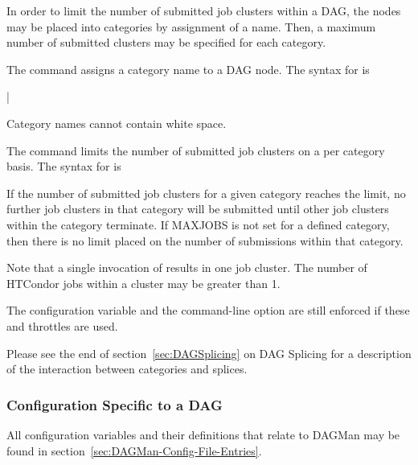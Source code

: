In order to limit the number of submitted job clusters within a DAG,
the nodes may be placed into categories by assignment of a name.
Then, a maximum number of submitted clusters may be specified
for each category.

The  command assigns a category name to a DAG node.
The syntax for  is

 | 

Category names cannot contain white space.

The  command limits the number of submitted job clusters
on a per category basis.
The syntax for  is

  

If the number of submitted job clusters for a given category reaches the limit,
no further job clusters in that category will be submitted until other
job clusters within the category terminate.
If MAXJOBS is not set for a defined category,
then there is no limit placed on the number of submissions
within that category.

Note that a single invocation
of  results in one job cluster.
The number of HTCondor jobs within a cluster may be greater than 1. 

The  configuration variable  
and the   command-line option
are still enforced if these  and 
throttles are used.

Please see the end of section~\ref{sec:DAGSplicing}
on DAG Splicing for a description of the interaction between
categories and splices.

\subsubsection{\label{sec:DAG-configuration}Configuration Specific to a DAG}

All configuration variables and their definitions that relate to 
DAGMan may be found in section~\ref{sec:DAGMan-Config-File-Entries}.

